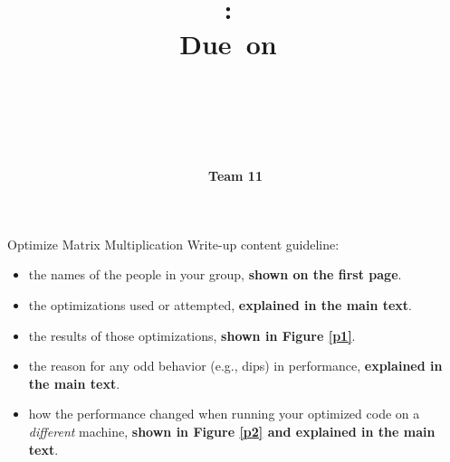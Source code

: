 \documentclass{article}
\title{
\vspace{2in}
\textmd{\textbf{\hmwkClass:\ \hmwkTitle}}\\
\normalsize
\vspace{0.1in}
\small{Due\ on\ \hmwkDueDate}\\
\vspace{0.1in}
\large{\textit{\hmwkSemester}}\\
\vspace{0.1in}
\large{\textit{\hmwkClassInstructor}}\\
\large{\textit{\hmwkSchool}}
\vspace{2in}
}
\author{\textbf{\hmwkAuthorName}
\\[0.2cm]
\textbf{Team 11}}
\date{} %
\begin{document}
\maketitle
\thispagestyle{empty}
\newpage

\begin{section}{Optimize Matrix Multiplication}
Write-up content guideline:
\begin{itemize}
  \item the names of the people in your group, \textbf{shown on the first page}.
  \item the optimizations used or attempted, \textbf{explained in the main text}.
  \item the results of those optimizations, \textbf{shown in Figure \ref{p1}}.
  \item the reason for any odd behavior (e.g., dips) in performance, \textbf{explained in the main text}.
  \item how the performance changed when running your optimized code on a \textit{different} machine, \textbf{shown in Figure \ref{p2} and explained in the main text}.
\end{itemize}
\end{section}
\end{document}
